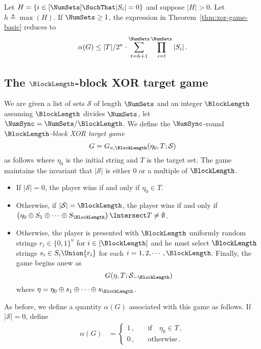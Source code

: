 \begin{remark}
Let $H = \{i \in [\NumSets] \SuchThat |S_i| = 0 \}$ and suppose $|H| > 0$.
Let $h \triangleq \max(H)$.
If $\NumSets \geq 1$, the expression in Theorem~\ref{thm:xor-game-basic} reduces to 
\[
    \alpha(G) \leq |T|/{2^{\kappa}} \cdot \sum_{t=h+1}^\NumSets \prod_{i=t}^{\NumSets}{|S_{i}|}
    \,.
\]
\end{remark}


\subsection{The $\BlockLength$-block XOR target game}\label{sec:xor-game-block}
We are given a list of sets $\mathcal{S}$ of length $\NumSets$ and an integer $\BlockLength$ 
assuming $\BlockLength$ divides $\NumSets$, let $\NumSync = \NumSets/\BlockLength$.
We define the $\NumSync$-round \emph{$\BlockLength$-block XOR target game}
\[
    G = G_{\kappa, \BlockLength}(\eta_0, T; \mathcal{S})
\]
as follows where $\eta_0$ is the initial string and $T$ is the target set. 
The game maintains the invariant 
that $|\mathcal{S}|$ is either $0$ or a multiple of $\BlockLength$. 
\begin{itemize}
    \item If $| \mathcal{S} | = 0$, the player wins if and only if $\eta_0 \in T$.
    \item Otherwise, if $|\mathcal{S}| = \BlockLength$, 
    the player wins if and only if $\left( \eta_0 \oplus S_1 \oplus \cdots \oplus S_\BlockLength \right) \Intersect T \neq \emptyset$.
    \item Otherwise, the player is presented with 
    $\BlockLength$ uniformly random strings $r_i \in \{0,1\}^\kappa$ for $i \in [\BlockLength]$
    and he must select $\BlockLength$ strings 
    $s_i \in S_i \Union \{r_i\}$ for each $i = 1, 2, \cdots, \BlockLength$.
    Finally, the game begins anew as 
    \[
        G(\eta, T; \mathcal{S}_{-\BlockLength} )
    \]
    where $\eta = \eta_0 \oplus s_1 \oplus \cdots \oplus s_\BlockLength$.
\end{itemize}
As before, we define a quantity $\alpha(G)$ associated with this game as follows. 
If $|\mathcal{S}| = 0$, define
\begin{align*}
    \alpha(G) &= 
    \begin{cases}
        1\,, & \quad\text{if}\quad \eta_0 \in T\, , \\
        0\,, & \quad\text{otherwise}\, .
    \end{cases}
\end{align*}
